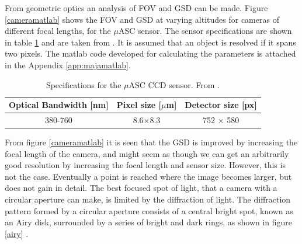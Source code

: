 \noindent
From geometric optics an analysis of FOV and GSD can be made. Figure \ref{cameramatlab} shows the FOV  and GSD at varying altitudes for cameras of different focal lengths, for the $\mu$ASC sensor. The sensor specifications are shown in table \ref{tab:ASC} and are taken from \cite{alessandro}. It is assumed that an object is resolved if it spans two pixels. The matlab code developed for calculating the parameters is attached in the Appendix \ref{app:majamatlab}.

\begin{table}[htb]
\begin{center}
\begin{tabular}{|c|c|c|}
\hline
Optical Bandwidth [nm] & Pixel size [$\mu$m] & Detector size [px]\\
\hline
380-760  & 8.6$\times $8.3 & 752 $\times$ 580 \\
\hline
\end{tabular}

\caption{Specifications for the $\mu$ASC CCD sensor. From \cite{alessandro}.}

\label{tab:ASC}
\end{center}
\end{table}

\noindent
From figure \ref{cameramatlab} it is seen that the GSD is improved by increasing the focal length of the camera, and might seem as though we can get an arbitrarily good resolution by increasing the focal length and sensor size. However, this is not the case. Eventually a point is reached where the image becomes larger, but does not gain in detail. The best focused spot of light, that a camera with a circular aperture can make, is limited by the diffraction of light. The diffraction pattern formed by a circular aperture consists of a central bright spot, known as an Airy disk, surrounded by a series of bright and dark rings, as shown in figure \ref{airy} \cite{uniphys}.

